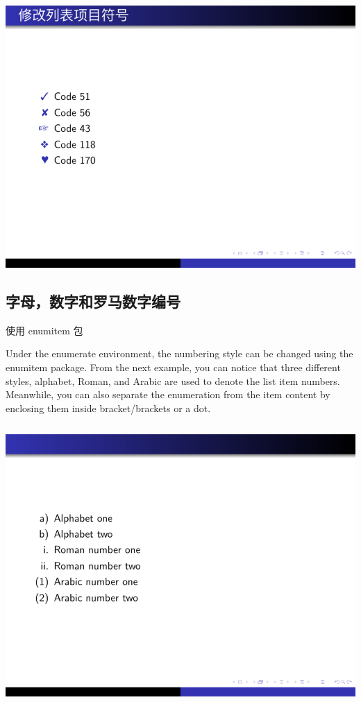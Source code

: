 \includegraphics{examples/beamer/beamerlist08.pdf}

\subsection{字母，数字和罗马数字编号}

使用 enumitem 包

Under the enumerate environment, the numbering style can be changed using the enumitem package. From the next example, you can notice that three different styles, alphabet, Roman, and Arabic are used to denote the list item numbers. Meanwhile, you can also separate the enumeration from the item content by enclosing them inside bracket/brackets or a dot.

\inputminted[linenos=true]{latex}{examples/beamer/beamerlist09.tex}

\includegraphics{examples/beamer/beamerlist09.pdf}

